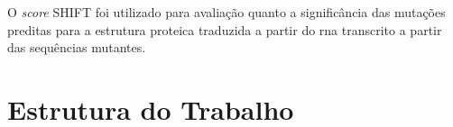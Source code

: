 O \textit{score} SHIFT foi utilizado para avaliação quanto a significância das mutações preditas para a estrutura proteica traduzida a partir do rna transcrito a partir das sequências mutantes.


\section{Estrutura do Trabalho}



